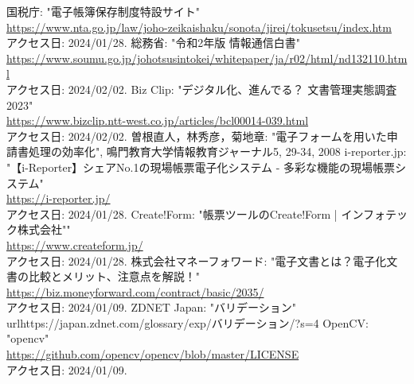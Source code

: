 \documentclass[uplatex, report, a4j, 10pt]{jsbook}
\begin{document}




%



%
\begin{thebibliography}{0}
  国税庁: "電子帳簿保存制度特設サイト"\\\url{https://www.nta.go.jp/law/joho-zeikaishaku/sonota/jirei/tokusetsu/index.htm}\\アクセス日: 2024/01/28.
  総務省: "令和2年版 情報通信白書"\\\url{https://www.soumu.go.jp/johotsusintokei/whitepaper/ja/r02/html/nd132110.html}\\アクセス日: 2024/02/02.
  Biz Clip: "デジタル化、進んでる？ 文書管理実態調査2023"\\\url{https://www.bizclip.ntt-west.co.jp/articles/bcl00014-039.html}\\アクセス日: 2024/02/02.
  曽根直人，林秀彦，菊地章: "電子フォームを用いた申請書処理の効率化", 鳴門教育大学情報教育ジャーナル5, 29-34, 2008
  i-reporter.jp: "【i-Reporter】シェアNo.1の現場帳票電子化システム - 多彩な機能の現場帳票システム"\\\url{https://i-reporter.jp/}\\アクセス日: 2024/01/28.
  Create!Form: "帳票ツールのCreate!Form | インフォテック株式会社""\\\url{https://www.createform.jp/}\\アクセス日: 2024/01/28.
  株式会社マネーフォワード: "電子文書とは？電子化文書の比較とメリット、注意点を解説！"\\\url{https://biz.moneyforward.com/contract/basic/2035/}\\アクセス日: 2024/01/09.
  ZDNET Japan: "バリデーション"\\url{https://japan.zdnet.com/glossary/exp/バリデーション/?s=4}
  OpenCV: "opencv"\\\url{https://github.com/opencv/opencv/blob/master/LICENSE}\\アクセス日: 2024/01/09.

\end{thebibliography}
\end{document}
